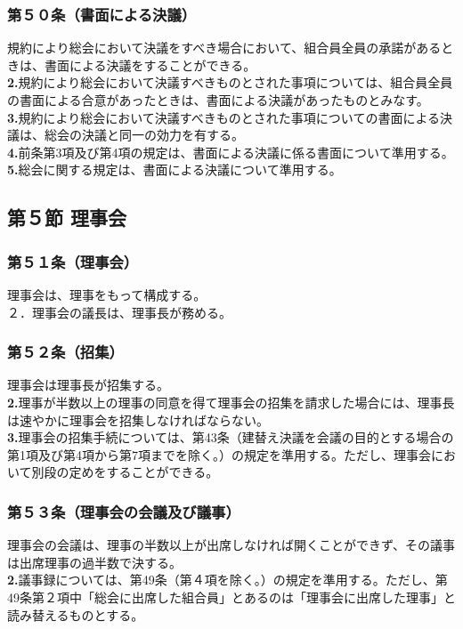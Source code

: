 \documentclass[12pt,uplatex]{jsarticle}
\begin{document}
\subsubsection*{第５０条（書面による決議）}
規約により総会において決議をすべき場合において、組合員全員の承諾があるときは、書面による決議をすることができる。\\
\textbf{2.}規約により総会において決議すべきものとされた事項については、組合員全員の書面による合意があったときは、書面による決議があったものとみなす。\\
\textbf{3.}規約により総会において決議すべきものとされた事項についての書面による決議は、総会の決議と同一の効力を有する。\\
\textbf{4.}前条第3項及び第4項の規定は、書面による決議に係る書面について準用する。\\
\textbf{5.}総会に関する規定は、書面による決議について準用する。

\begin{center}
\subsection*{第５節 理事会}
\end{center}
\subsubsection*{第５１条（理事会）}
理事会は、理事をもって構成する。\\
２．理事会の議長は、理事長が務める。
\subsubsection*{第５２条（招集）}
理事会は理事長が招集する。\\
\textbf{2.}理事が半数以上の理事の同意を得て理事会の招集を請求した場合には、理事長は速やかに理事会を招集しなければならない。\\
\textbf{3.}理事会の招集手続については、第43条（建替え決議を会議の目的とする場合の第1項及び第4項から第7項までを除く。）の規定を準用する。ただし、理事会において別段の定めをすることができる。
\subsubsection*{第５３条（理事会の会議及び議事）}
理事会の会議は、理事の半数以上が出席しなければ開くことができず、その議事は出席理事の過半数で決する。\\
\textbf{2.}議事録については、第49条（第４項を除く。）の規定を準用する。ただし、第49条第２項中「総会に出席した組合員」とあるのは「理事会に出席した理事」と読み替えるものとする。
\end{document}
